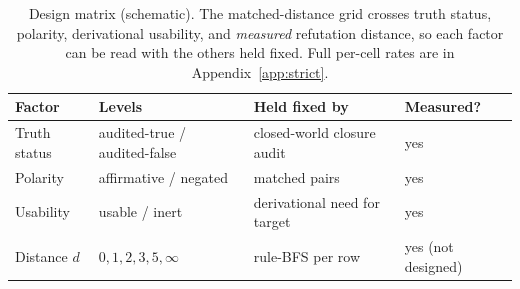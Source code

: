 \begin{table}[t]
\centering
\caption{Design matrix (schematic). The matched-distance grid crosses truth
status, polarity, derivational usability, and \emph{measured} refutation
distance, so each factor can be read with the others held fixed. Full
per-cell rates are in Appendix~\ref{app:strict}. }
\label{tab:design}
\begin{tabular}{@{}llll@{}}
\toprule
Factor & Levels & Held fixed by & Measured? \\
\midrule
Truth status & audited-true / audited-false & closed-world closure audit & yes \\
Polarity & affirmative / negated & matched pairs & yes \\
Usability & usable / inert & derivational need for target & yes \\
Distance $d$ & $0,1,2,3,5,\infty$ & rule-BFS per row & yes (not designed) \\
\bottomrule
\end{tabular}
\end{table}
